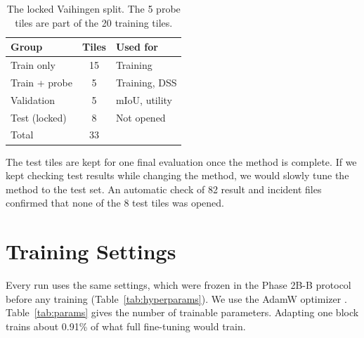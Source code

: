 \documentclass[11pt,a4paper]{report}
\begin{document}
\begin{table}[t]
\centering
\caption{The locked Vaihingen split. The 5 probe tiles are part of the 20 training tiles.}
\label{tab:split}
\small
\begin{tabular}{@{}lcl@{}}
\toprule
\textbf{Group} & \textbf{Tiles} & \textbf{Used for} \\
\midrule
Train only & 15 & Training \\
Train + probe & 5 & Training, DSS \\
Validation & 5 & mIoU, utility \\
Test (locked) & 8 & Not opened \\
\midrule
Total & 33 & \\
\bottomrule
\end{tabular}
\end{table}

The test tiles are kept for one final evaluation once the method is complete. If we kept checking test results while changing the method, we would slowly tune the method to the test set. An automatic check of 82 result and incident files confirmed that none of the 8 test tiles was opened.

\section{Training Settings}

Every run uses the same settings, which were frozen in the Phase 2B-B protocol before any training (Table~\ref{tab:hyperparams}). We use the AdamW optimizer \cite{loshchilov2019decoupled}. Table~\ref{tab:params} gives the number of trainable parameters. Adapting one block trains about 0.91\% of what full fine-tuning would train.
\end{document}
